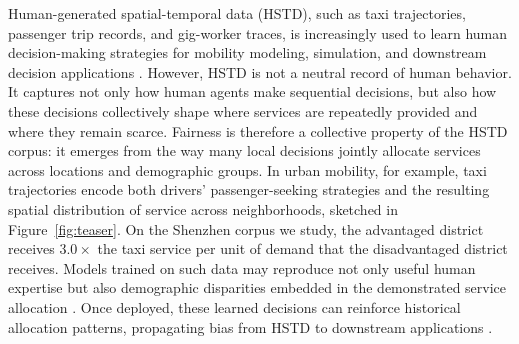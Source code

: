 Human-generated spatial-temporal data (HSTD), such as taxi trajectories,
passenger trip records, and gig-worker traces, is increasingly used to learn
human decision-making strategies for mobility modeling, simulation, and
downstream decision applications
\cite{zhang2019cgail,zhang2022cgail,feng2020simulate}. However, HSTD is not a
neutral record of human behavior. It captures not only how human agents make
sequential decisions, but also how these decisions collectively shape where
services are repeatedly provided and where they remain scarce. Fairness is
therefore a collective property of the HSTD corpus: it emerges from the way
many local decisions jointly allocate services across locations and
demographic groups. In urban mobility, for example, taxi trajectories encode
both drivers' passenger-seeking strategies and the resulting spatial
distribution of service across neighborhoods, sketched in
Figure~\ref{fig:teaser}. On the Shenzhen corpus we study, the advantaged
district receives $3.0\times$ the taxi service per unit of demand that the
disadvantaged district receives.
Models trained on such data may reproduce not only useful human expertise but
also demographic disparities embedded in the demonstrated service allocation
\cite{zhao2017menshopping,wang2021directional}. Once deployed, these learned
decisions can reinforce historical allocation patterns, propagating bias from
HSTD to downstream applications \cite{ensign2018,lumisaac2016}.

